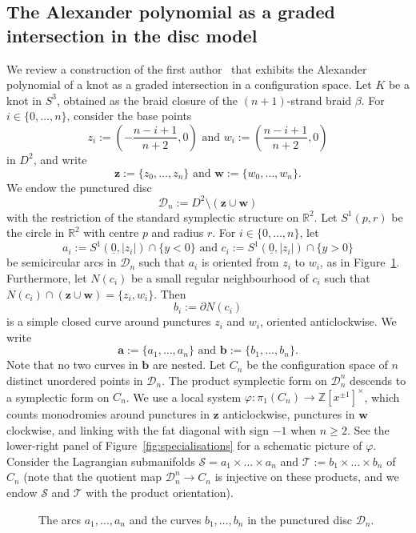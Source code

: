 \documentclass[11pt]{amsart}
\numberwithin{equation}{section}
\numberwithin{figure}{section}
\theoremstyle{definition}
\newcommand{\cD}{\mathcal{D}}
\newcommand{\cs}{\mathscr{S}}
\newcommand{\ct}{\mathscr{T}}
\newcommand{\bR}{\mathbb{R}}
\newcommand{\bZ}{\mathbb{Z}}
\newcommand{\ba}{\boldsymbol{a}}
\newcommand{\bb}{\boldsymbol{b}}
\newcommand{\ws}{\boldsymbol{w}}
\newcommand{\zs}{\boldsymbol{z}}
\begin{document}
\subsection{The Alexander polynomial as a graded intersection in the disc model}\label{ss1} We review a construction of the first author~\cite{Anghel2024AIF} that exhibits the Alexander polynomial of a knot as a graded intersection in a configuration space. Let $K$ be a knot in $S^3$, obtained as the braid closure of the $(n+1)$-strand braid $\beta$. For $i \in \{0,\dots,n\}$, consider the base points 
\[
z_i := \left(-\frac{n-i+1}{n+2}, 0 \right) \text{ and } w_i := \left(\frac{n-i+1}{n+2}, 0 \right) 
\]
in $D^2$, and write
\[
\zs := \{z_0,\dots,z_n\} \text{ and } \ws := \{w_0,\dots,w_n\}.
\]
We endow the punctured disc 
\[
\cD_n := D^2 \setminus (\zs \cup \ws)
\]
with the restriction of the standard symplectic structure on $\bR^2$. Let $S^1(p, r)$ be the circle in $\bR^2$ with centre $p$ and radius $r$. For $i \in \{0,\dots,n\}$, let 
\begin{equation}\label{eqn:a_i-c_i}
a_i := S^1(\underline{0}, |z_i|) \cap \{y<0\} \text{ and } c_i := S^1(\underline{0}, |z_i|) \cap \{y > 0\}
\end{equation}
be semicircular arcs in $\cD_n$ such that $a_i$ is oriented from $z_i$ to $w_i$, as in Figure~\ref{fig:disc-model}. Furthermore, let $N(c_i)$ be a small regular neighbourhood of $c_i$ such that $N(c_i) \cap (\zs \cup \ws) = \{z_i, w_i\}$. Then
\[
b_i := \partial N(c_i)
\]
is a simple closed curve around punctures $z_i$ and $w_i$, oriented anticlockwise. We write
\[
\ba := \{a_1,\dots,a_n\} \text{ and } \bb := \{b_1,\dots,b_n\}.
\]
Note that no two curves in $\bb$ are nested. Let $C_n$ be the configuration space of $n$ distinct unordered points in $\cD_n$. The product symplectic form on $\cD_n^n$ descends to a symplectic form on $C_n$. We use a local system $\varphi \colon \pi_1(C_n) \to \bZ[x^{\pm 1}]^\times$, which counts monodromies around punctures in $\zs$ anticlockwise, punctures in $\ws$ clockwise, and linking with the fat diagonal with sign $-1$ when $n \ge 2$. See the lower-right panel of Figure~\ref{fig:specialisations} for a schematic picture of $\varphi$. Consider the Lagrangian submanifolds $\cs = a_1 \times \dots \times a_n$ and $\ct := b_1 \times \dots \times b_n$ of $C_n$ (note that the quotient map $\cD_n^n \to C_n$ is injective on these products, and we endow $\cs$ and $\ct$ with the product orientation).

\begin{figure}
\centering
\def\svgwidth{0.9\textwidth}

\caption{The arcs $a_1,\dots,a_n$ and the curves $b_1,\dots,b_n$ in the punctured disc $\cD_n$.}
\label{fig:disc-model}
\end{figure}
\end{document}
